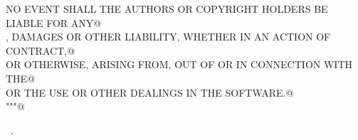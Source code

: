 \documentclass[11pt,oneside]{article}	%
\begin{document}
\begin{flushleft}
\begin{minipage}{\linewidth}
\begin{list}{}{}
\mbox{}\verb@IN NO EVENT SHALL THE AUTHORS OR COPYRIGHT HOLDERS BE LIABLE FOR ANY@\\
\mbox{}\verb@CLAIM, DAMAGES OR OTHER LIABILITY, WHETHER IN AN ACTION OF CONTRACT,@\\
\mbox{}\verb@TORT OR OTHERWISE, ARISING FROM, OUT OF OR IN CONNECTION WITH THE@\\
\mbox{}\verb@SOFTWARE OR THE USE OR OTHER DEALINGS IN THE SOFTWARE.@\\
\mbox{}\verb@"""@\\
\mbox{}\verb@@{\NWsep}
\end{list}
\vspace{-1ex}
\footnotesize\addtolength{\baselineskip}{-1ex}
\begin{list}{}{\setlength{\itemsep}{-\parsep}\setlength{\itemindent}{-\leftmargin}}
\item \NWtxtMacroRefIn\ .
\end{list}
\end{minipage}\\[4ex]
\end{flushleft}
\end{document}
